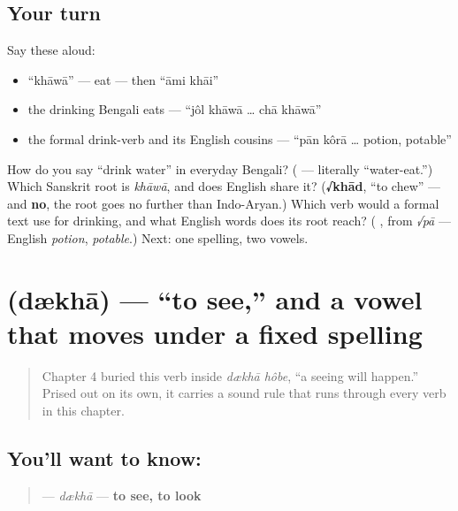 \subsection*{Your turn}
Say these aloud:

\begin{itemize}
\raggedright
  \item \textquotedblleft{}khāwā\textquotedblright{} — eat — then \textquotedblleft{}āmi khāi\textquotedblright{}
  \item the drinking Bengali eats — \textquotedblleft{}jôl khāwā … chā khāwā\textquotedblright{}
  \item the formal drink-verb and its English cousins — \textquotedblleft{}pān kôrā … potion, potable\textquotedblright{}
\end{itemize}

\begin{tcolorbox}[breakable,colback=teal!4,colframe=teal!35!black,title={Before you move on}]
How do you say \textquotedblleft{}drink water\textquotedblright{} in everyday Bengali? (\textbf{ } — literally \textquotedblleft{}water-eat.\textquotedblright{}) Which Sanskrit root is \emph{khāwā}, and does English share it? (\textbf{√khād}, \textquotedblleft{}to chew\textquotedblright{} — and \textbf{no}, the root goes no further than Indo-Aryan.) Which verb would a formal text use for drinking, and what English words does its root reach? (\textbf{ }, from \emph{√pā} — English \emph{potion}, \emph{potable}.) Next: one spelling, two vowels.
\end{tcolorbox}
\section[dækhā]{ (dækhā) — \textquotedblleft{}to see,\textquotedblright{} and a vowel that moves under a fixed spelling}

\label{lesson:BN-C07-dekha}



\begin{quote}
Chapter 4 buried this verb inside \emph{dækhā hôbe}, \textquotedblleft{}a seeing will happen.\textquotedblright{} Prised out on its own, it carries a sound rule that runs through every verb in this chapter.
\end{quote}

\subsection*{You'll want to know: }
\begin{quote}
\textbf{} — \emph{dækhā} — \textbf{to see, to look}
\end{quote}

